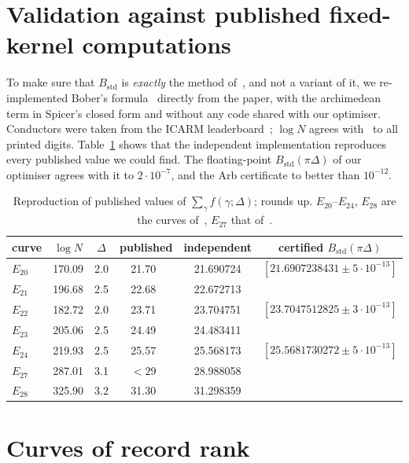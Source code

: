 \documentclass[11pt]{amsart}
\theoremstyle{remark}
\theoremstyle{definition}
\begin{document}
\section{Validation against published fixed-kernel computations}\label{sec:valid}

To make sure that $B_{\mathrm{std}}$ is \emph{exactly} the method of~\cite{Bober,KSW}, and not a variant of it, we re-implemented Bober's formula~\cite[eq.~(3)]{Bober} directly from the paper, with the archimedean term in Spicer's closed form and without any code shared with our optimiser. Conductors were taken from the ICARM leaderboard~\cite{ICARM}; $\log N$ agrees with~\cite[Table~1]{Bober} to all printed digits. Table~\ref{tab:valid} shows that the independent implementation reproduces every published value we could find. The floating-point $B_{\mathrm{std}}(\pi\Delta)$ of our optimiser agrees with it to $2\cdot10^{-7}$, and the Arb certificate to better than $10^{-12}$.

\begin{table}[h]
\centering\small
\begin{tabular}{lccccc}
\toprule
curve & $\log N$ & $\Delta$ & published & independent & certified $B_{\mathrm{std}}(\pi\Delta)$\\
\midrule
$E_{20}$ & 170.09 & 2.0 & 21.70~\cite{Bober} & 21.690724 & $[21.6907238431\pm5\cdot10^{-13}]$\\
$E_{21}$ & 196.68 & 2.5 & 22.68~\cite{Bober} & 22.672713 & \\
$E_{22}$ & 182.72 & 2.0 & 23.71~\cite{Bober} & 23.704751 & $[23.7047512825\pm3\cdot10^{-13}]$\\
$E_{23}$ & 205.06 & 2.5 & 24.49~\cite{Bober} & 24.483411 & \\
$E_{24}$ & 219.93 & 2.5 & 25.57~\cite{Bober} & 25.568173 & $[25.5681730272\pm5\cdot10^{-13}]$\\
$E_{27}$ & 287.01 & 3.1 & $<29$~\cite{KSW} & 28.988058 & \\
$E_{28}$ & 325.90 & 3.2 & 31.30~\cite{Bober} & 31.298359 & \\
\bottomrule
\end{tabular}
\caption{Reproduction of published values of $\sum_\gamma f(\gamma;\Delta)$; \cite{Bober} rounds up. $E_{20}$--$E_{24}$, $E_{28}$ are the curves of~\cite{Bober}, $E_{27}$ that of~\cite{KSW}.}
\label{tab:valid}
\end{table}

\section{Curves of record rank}\label{sec:records}
\end{document}
